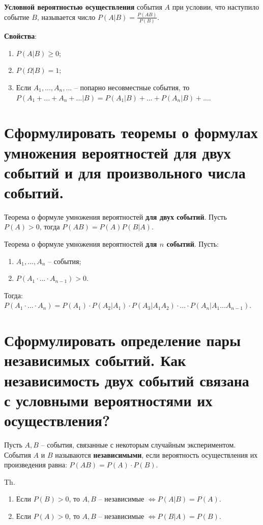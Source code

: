 \textbf{Условной вероятностью осуществления} события $A$ при условии, что наступило событие $B$, называется число $P(A | B) = \frac{P(AB)}{P(B)}$.

\textbf{Свойства}:
\begin{enumerate}
	\item $P(A|B) \geq 0$;
	\item $P(\Omega | B) = 1$;
	\item Если $A_1, ..., A_n, ...$ -- попарно несовместные события, то $P(A_1 + ... + A_n + ... | B) = P(A_1 | B) + ... + P(A_n | B) + ...$.
\end{enumerate}

\section{Сформулировать теоремы о формулах умножения вероятностей для двух событий и для произвольного числа событий.}

Теорема о формуле умножения вероятностей \textbf{для двух событий}. Пусть $P(A) > 0$, тогда $P(AB) = P(A)P(B|A)$.

Теорема о формуле умножения вероятностей \textbf{для $n$ событий}. Пусть:
\begin{enumerate}
	\item $A_1, ..., A_n$ -- события;
	\item $P(A_1 \cdot ... \cdot A_{n-1}) > 0$.
\end{enumerate}

Тогда: $P(A_1 \cdot ... \cdot A_n) = P(A_1) \cdot P(A_2 | A_1) \cdot P(A_3 | A_1A_2) \cdot ... \cdot P(A_{n} | A_1 ... A_{n-1})$.

\section{Сформулировать определение пары независимых событий. Как независимость двух событий связана с условными вероятностями их осуществления?}

Пусть $A, B$ -- события, связанные с некоторым случайным экспериментом. События $A$ и $B$ называются \textbf{независимыми}, если вероятность осуществления их произведения равна: $P(AB) = P(A) \cdot P(B)$.

Th.
\begin{enumerate}
	\item Если $P(B)>0$, то $A, B$ -- независимые $\Leftrightarrow P(A|B) = P(A)$.
	\item Если $P(A)>0$, то $A, B$ -- независимые $\Leftrightarrow P(B|A) = P(B)$.
\end{enumerate}

